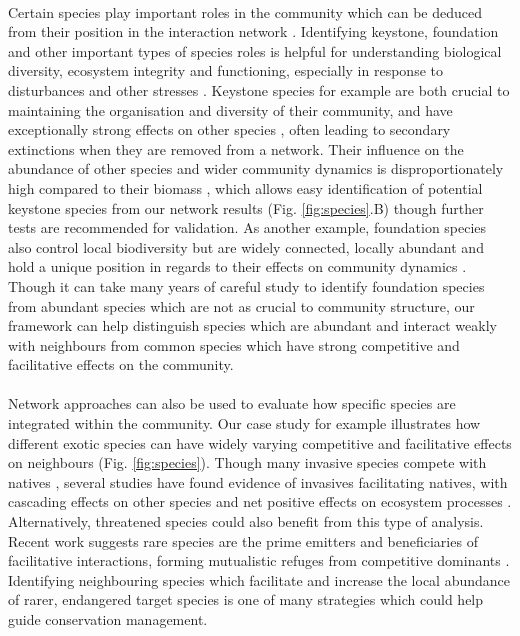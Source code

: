 \documentclass[a4,12pt]{article}
\begin{document}
    \paragraph{}
    Certain species play important roles in the community which can be deduced from their position in the interaction network \parencite{Cirtwill2018a}. Identifying keystone, foundation and other important types of species roles is helpful for understanding biological diversity, ecosystem integrity and functioning, especially in response to disturbances and other stresses \parencite{Nyakatya2008, Orwin2016, Losapio2017, Narwani2019}.    Keystone species for example are both crucial to maintaining the organisation and diversity of their community, and have exceptionally strong effects on other species \parencite{Mills1993}, often leading to secondary extinctions when they are removed from a network. Their influence on the abundance of other species and wider community dynamics is disproportionately high compared to their biomass \parencite{Power1996, Piraino2002, Libralato2006}, which allows easy identification of potential keystone species from our network results (Fig. \ref{fig:species}.B) though further tests are recommended for validation. As another example, foundation species also control local biodiversity but are widely connected, locally abundant and hold a unique position in regards to their effects on community dynamics \parencite{Ellison2005, Baiser2013, Ellison2019}. Though it can take many years of careful study to identify foundation species from abundant species which are not as crucial to community structure, our framework can help distinguish species which are abundant and interact weakly with neighbours from common species which have strong competitive and facilitative effects on the community. 

    \paragraph{} %
    Network approaches can also be used to evaluate how specific species are integrated within the community. Our case study for example illustrates how different exotic species can have widely varying competitive and facilitative effects on neighbours (Fig. \ref{fig:species}). Though many invasive species compete with natives \parencite{Naeem2000, Riley2008, Zheng2015}, several studies have found evidence of invasives facilitating natives, with cascading effects on other species and net positive effects on ecosystem processes \parencite{Rodriguez2006, Ramus2017}. Alternatively, threatened species could also benefit from this type of analysis. Recent work suggests rare species are the prime emitters and beneficiaries of facilitative interactions, forming mutualistic refuges from competitive dominants \parencite{Calatayud2019, Hines2020}. Identifying neighbouring species which facilitate and increase the local abundance of rarer, endangered target species is one of many strategies which could help guide conservation management.
\end{document}
